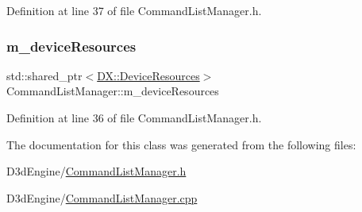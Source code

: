 Definition at line 37 of file Command\+List\+Manager.\+h.

\mbox{\label{class_command_list_manager_a1c48b5dc7b34886ce5057ac194a2385e}} 
\subsubsection{\texorpdfstring{m\+\_\+device\+Resources}{m\_deviceResources}}
{\footnotesize\ttfamily std\+::shared\+\_\+ptr$<$\mbox{\hyperlink{class_d_x_1_1_device_resources}{D\+X\+::\+Device\+Resources}}$>$ Command\+List\+Manager\+::m\+\_\+device\+Resources\hspace{0.3cm}{\ttfamily [private]}}



Definition at line 36 of file Command\+List\+Manager.\+h.



The documentation for this class was generated from the following files\+:\begin{DoxyCompactItemize}
\item 
D3d\+Engine/\mbox{\hyperlink{_command_list_manager_8h}{Command\+List\+Manager.\+h}}\item 
D3d\+Engine/\mbox{\hyperlink{_command_list_manager_8cpp}{Command\+List\+Manager.\+cpp}}\end{DoxyCompactItemize}
